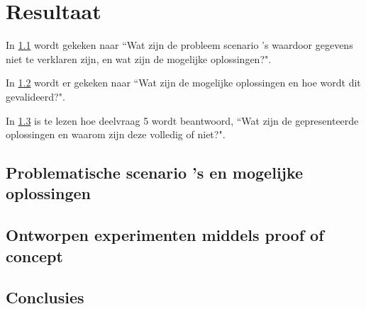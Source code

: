 \chapter{Resultaat}

In \ref{sec:deelvraag3} wordt gekeken naar ``Wat zijn de probleem scenario 's waardoor gegevens niet te verklaren zijn, en wat zijn de mogelijke oplossingen?".

In \ref{sec:deelvraag4} wordt er gekeken naar ``Wat zijn de mogelijke oplossingen en hoe wordt dit gevalideerd?".

In \ref{sec:deelvraag5} is te lezen hoe deelvraag 5 wordt beantwoord, ``Wat zijn de gepresenteerde oplossingen en waarom zijn deze volledig of niet?".

\clearpage


\section{Problematische scenario 's en mogelijke oplossingen}
\label{sec:deelvraag3}

\clearpage

\section{Ontworpen experimenten middels proof of concept}
\label{sec:deelvraag4}

\clearpage

\section{Conclusies}
\label{sec:deelvraag5}

